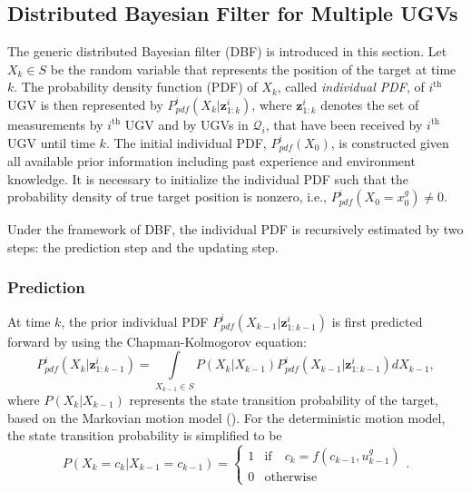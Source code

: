 \documentclass[journal]{IEEEtranTIE}
\theoremstyle{remark}
\newcommand{\X}{X}
\begin{document}
	\subsection{Distributed Bayesian Filter for Multiple UGVs}\label{subsec:dbf}
	The generic distributed Bayesian filter (DBF) is introduced in this section.
	Let $\X_k\in S$ be the random variable that represents the position of the target at time $k$.
	The probability density function (PDF) of $\X_k$, called \textit{individual PDF}, of $i^\text{th}$ UGV is then represented by
	$P^i_{pdf}(\X_{k}|\mathbf{z}^i_{1:k})$, where $\mathbf{z}^i_{1:k}$ denotes the set of measurements by $i^\text{th}$ UGV and by UGVs in $\mathcal{Q}_i$, that have been received by $i^\text{th}$ UGV until time $k$.
	The initial individual PDF, $P^i_{pdf}(\X_0)$, is constructed 
	given all available prior information including past experience and environment knowledge. 
	It is necessary to initialize the individual PDF such that the probability density of true target position is nonzero, i.e., $P^i_{pdf}(\X_0=x^g_0)\neq 0$. 
	
	Under the framework of DBF, the individual PDF is recursively estimated by two steps: the prediction step and the updating step.
	
	\subsubsection{Prediction}
	At time $k$, the prior individual PDF $P^i_{pdf}(\X_{k-1}|\mathbf{z}^i_{1:k-1})$ is first predicted forward by using the Chapman-Kolmogorov equation:
	\small
	\begin{equation}\label{eqn:bayes_pred}
		P^i_{pdf}(\X_k|\mathbf{z}^i_{1:k-1})
		=\int\limits_{\X_{k-1}\in S} P(\X_k|\X_{k-1})P^i_{pdf}(\X_{k-1}|\mathbf{z}^i_{1:k-1})d\X_{k-1},
	\end{equation}\normalsize
	where $P(\X_k|\X_{k-1})$ represents the state transition probability of the target, based on the Markovian motion model ().
	For the deterministic motion model, the state transition probability is simplified to be
	\small\begin{equation}\label{eqn:markov_model}
		P(\X_k=c_k|\X_{k-1}=c_{k-1})=\begin{cases}
			1 & \text{if}\quad c_k=f(c_{k-1},u^g_{k-1})\\ %
			0 & \text{otherwise}
		\end{cases}.
	\end{equation}\normalsize
	
\end{document}
